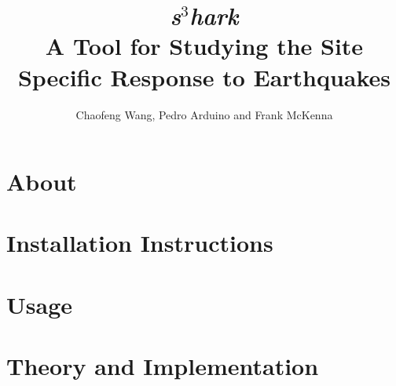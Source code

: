 \documentclass{simcenterdocumentation}
\begin{document}
\title{     {\selectfont \textbf{\textit{s$^3$hark  }} }       \\ A Tool for Studying the Site Specific Response to Earthquakes}
\author{Chaofeng Wang, Pedro Arduino and Frank McKenna}

\hypersetup{pageanchor=false}
\maketitle
\copyrightpage
\acknowledgments

\hypersetup{pageanchor=true}
\begin{frontmatter}

\pagestyle{plain}
{
  \renewcommand{\thispagestyle}[1]{}
  \tableofcontents
  \clearpage
  \listoffigures
  \clearpage
  \listoftables
}

\end{frontmatter}
\pagestyle{somewhatsimple}

\chapter{About}
\label{chap:about}


\chapter{Installation Instructions}
\label{chap:installation}


\chapter{Usage}
\label{chap:usage}


\chapter{Theory and Implementation}
\label{chap:theory}

\end{document}
